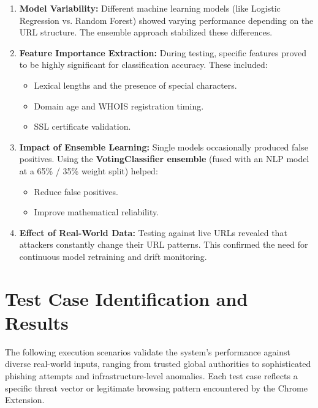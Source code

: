 \begin{enumerate}
    \item \textbf{Model Variability:}
    Different machine learning models (like Logistic Regression vs. Random Forest) showed varying performance depending on the URL structure. The ensemble approach stabilized these differences.

    \item \textbf{Feature Importance Extraction:}
    During testing, specific features proved to be highly significant for classification accuracy. These included:
    \begin{itemize}
        \item Lexical lengths and the presence of special characters.
        \item Domain age and WHOIS registration timing.
        \item SSL certificate validation.
    \end{itemize}

    \item \textbf{Impact of Ensemble Learning:}
    Single models occasionally produced false positives. Using the \textbf{VotingClassifier ensemble} (fused with an NLP model at a 65\% / 35\% weight split) helped:
    \begin{itemize}
        \item Reduce false positives.
        \item Improve mathematical reliability.
    \end{itemize}

    \item \textbf{Effect of Real-World Data:}
    Testing against live URLs revealed that attackers constantly change their URL patterns. This confirmed the need for continuous model retraining and drift monitoring.
\end{enumerate}

\section{Test Case Identification and Results}
\noindent
The following execution scenarios validate the system's performance against diverse real-world inputs, ranging from trusted global authorities to sophisticated phishing attempts and infrastructure-level anomalies. Each test case reflects a specific threat vector or legitimate browsing pattern encountered by the Chrome Extension.

